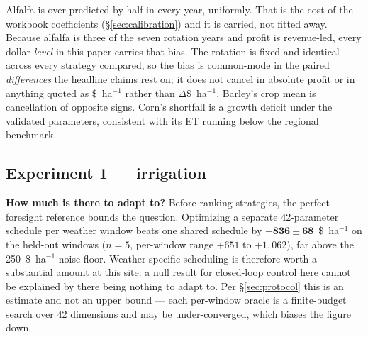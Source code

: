 \documentclass[a4paper,fleqn]{cas-sc}
\begin{document}
Alfalfa is over-predicted by half in every year, uniformly. That is the cost of the
workbook coefficients (\S\ref{sec:calibration}) and it is carried, not fitted away.
Because alfalfa is three of the seven rotation years and profit is revenue-led, every
dollar \emph{level} in this paper carries that bias. The rotation is fixed and identical
across every strategy compared, so the bias is common-mode in the paired
\emph{differences} the headline claims rest on; it does not cancel in absolute profit or
in anything quoted as \$~ha$^{-1}$ rather than $\Delta$\$~ha$^{-1}$. Barley's crop mean
is cancellation of opposite signs. Corn's shortfall is a growth deficit under the
validated parameters, consistent with its ET running below the regional benchmark.

\subsection{Experiment 1 --- irrigation}\label{sec:exp1}

\textbf{How much is there to adapt to?} Before ranking strategies, the perfect-foresight
reference bounds the question. Optimizing a separate 42-parameter schedule per weather
window beats one shared schedule by $\mathbf{+836 \pm 68}$~\$~ha$^{-1}$ on the held-out
windows ($n = 5$, per-window range $+651$ to $+1{,}062$), far above the
250~\$~ha$^{-1}$ noise floor. Weather-specific scheduling is therefore worth a
substantial amount at this site: a null result for closed-loop control here cannot be
explained by there being nothing to adapt to. Per \S\ref{sec:protocol} this is an
estimate and not an upper bound --- each per-window oracle is a finite-budget search over
42 dimensions and may be under-converged, which biases the figure down.

\end{document}
